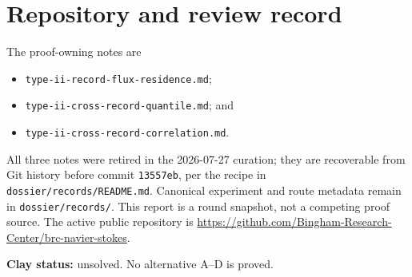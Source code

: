 \documentclass[11pt]{article}
\theoremstyle{definition}
\theoremstyle{remark}
\begin{document}
\section{Repository and review record}

The proof-owning notes are
\begin{itemize}
\item \texttt{type-ii-record-flux-residence.md};
\item \texttt{type-ii-cross-record-quantile.md}; and
\item \texttt{type-ii-cross-record-correlation.md}.
\end{itemize}
All three notes were retired in the 2026-07-27 curation; they are
recoverable from Git history before commit \texttt{13557eb}, per the
recipe in \texttt{dossier/records/README.md}.
Canonical experiment and route metadata remain in
\texttt{dossier/records/}.  This report is a round snapshot, not a competing
proof source.  The active public repository is
\url{https://github.com/Bingham-Research-Center/brc-navier-stokes}.

\bigskip
\noindent\textbf{Clay status:} unsolved.  No alternative A--D is proved.
\end{document}
